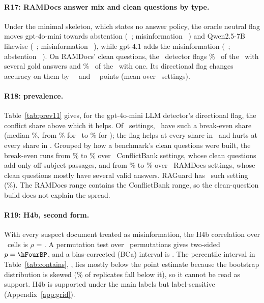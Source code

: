 \paragraph{R17: RAMDocs answer mix and clean questions by type.} Under the minimal skeleton, which states no answer
policy, the oracle neutral flag moves gpt-4o-mini towards abstention (\mixMinMiniAbstainDiff\
\mixMinMiniAbstainDiffCI; misinformation \mixMinMiniMisinfoDiff\ \mixMinMiniMisinfoDiffCI) and Qwen2.5-7B likewise
(\mixMinQwenAbstainDiff\ \mixMinQwenAbstainDiffCI; misinformation \mixMinQwenMisinfoDiff\ \mixMinQwenMisinfoDiffCI),
while gpt-4.1 adds the misinformation (\mixMinFourMisinfoDiff\ \mixMinFourMisinfoDiffCI; abstention
\mixMinFourAbstainDiff\ \mixMinFourAbstainDiffCI). On RAMDocs' clean questions, the \cleanTypeDet\ detector flags
\cleanTypeRateSeveral\% \cleanTypeRateSeveralCI\ of the \cleanTypeNSeveral\ with several gold answers and
\cleanTypeRateOne\% \cleanTypeRateOneCI\ of the \cleanTypeNOne\ with one. Its directional flag changes accuracy on
them by \cleanTypeEffSeveral\ \cleanTypeEffSeveralCI\ and \cleanTypeEffOne\ \cleanTypeEffOneCI\ points (mean over
\cleanTypeK\ settings).


\paragraph{R18: prevalence.} Table~\ref{tab:prev11} gives, for the gpt-4o-mini LLM detector's directional flag, the
conflict share above which it helps. Of \pvN\ settings, \pvBeN\ have such a break-even share (median \pvBeMedian\%,
from \pvBeMin\% for \pvBeMinSet\ to \pvBeMax\% for \pvBeMaxSet); the flag helps at every share in \pvHelpsAll\ and
hurts at every share in \pvHurtsAll. Grouped by how a benchmark's clean questions were built, the break-even runs
from \pvBeCbMin\% to \pvBeCbMax\% over \pvBeCbN\ ConflictBank settings, whose clean questions add only off-subject
passages, and from \pvBeRdMin\% to \pvBeRdMax\% over \pvBeRdN\ RAMDocs settings, whose clean questions mostly have
several valid answers. RAGuard has \pvBeRgN\ such setting (\pvBeRgMin\%). The RAMDocs range contains the ConflictBank range, so the clean-question build does not
explain the spread.

\paragraph{R19: H4b, second form.} With every suspect document treated as misinformation, the H4b correlation over
\hFourBN\ cells is $\rho$ = \hFourBRho. A permutation test over \hFourBPerm\ permutations gives two-sided $p=\hFourBP$,
and a bias-corrected (BCa) interval is \hFourBBcaCI. The percentile interval in Table~\ref{tab:contains},
\hFourBPctCI, lies mostly below the point estimate because the bootstrap distribution is skewed (\hFourBBelow\% of
replicates fall below it), so it cannot be read as support. H4b is supported under the main labels but
label-sensitive (Appendix~\ref{app:grid}).

